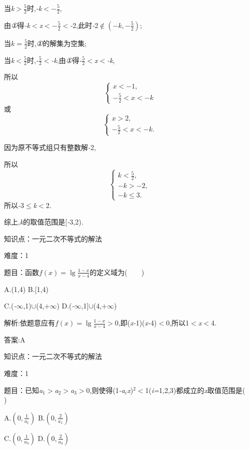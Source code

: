 \documentclass{article} %
\begin{document}
当\textit{k$>\frac{5}{2}$}时,\textit{-k$<-\frac{5}{2}$},

由\textit{①}得\textit{-k$<$x$<-\frac{5}{2}$}\textit{$<$-}2,此时\textit{-}2$\mathrm{\notin} (-k, -\frac{5}{2})$;

当\textit{$k=\frac{5}{2}$}时,\textit{①}的解集为空集;

当\textit{k$<\frac{5}{2}$}时,\textit{-}\textit{$\frac{5}{2}<$-k},由\textit{①}得\textit{-}\textit{$\frac{5}{2}<$x$<$-k},

所以
\[
\begin{cases}
x<-1, \\
-\frac{5}{2} < x <-k
\end{cases}
\] 或
\[
\begin{cases}
x>2,\\
-\frac{5}{2} < x < -k.
\end{cases}
\]

因为原不等式组只有整数解\textit{-}2,

所以
\[
\begin{cases}
k <\frac{5}{2},\\
-k > -2,\\
-k \le 3.
\end{cases}
\]
所以\textit{-}3$\mathrm{\le}$\textit{k$<$}2\textit{.}

综上,\textit{k}的取值范围是[\textit{-}3,2)\textit{.}


知识点：一元二次不等式的解法

难度：1

 题目：函数$ f(x)=\lg\frac{1-x}{x-4}$的定义域为(\textit{　　})

 

 A.(1,4) B.[1,4)

 C.(\textit{-$\infty$},1)$\mathrm{\cup}$(4,\textit{$+\infty$}) D.(\textit{-$\infty$},1]$\mathrm{\cup}$(4,\textit{$+\infty$})

 解析:依题意应有$f(x)=\lg\frac{1-x}{x-4}>0 $,即(\textit{x-}1)(\textit{x-}4)\textit{$<$}0,所以1\textit{$<$x$<$}4\textit{.}

 答案:A

知识点：一元二次不等式的解法

难度：1

 题目：已知\textit{a}${}_{1}$\textit{$>$a}${}_{2}$\textit{$>$a}${}_{3}$\textit{$>$}0,则使得(1\textit{-a${}_{i}$x})${}^{2}$\textit{$<$}1(\textit{i=}1,2,3)都成立的\textit{x}取值范围是(\textit{　　})

 A.$(0,\frac{1}{a_1})$ B.$(0,\frac{2}{a_1})$

 C.$(0,\frac{1}{a_3})$ D.$(0,\frac{2}{a_3})$
\end{document}
